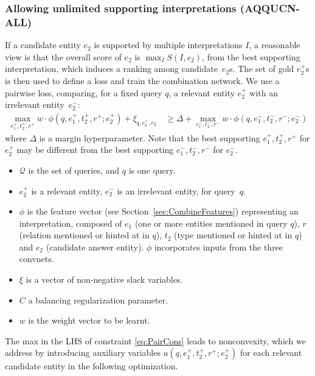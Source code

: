 \documentclass{svjour3}
\begin{document}
\subsubsection{Allowing unlimited supporting interpretations (AQQUCN-ALL)}
\label{sec:lvdt}

If a candidate entity $e_2$ is supported by multiple interpretations $I$, a reasonable view is that the overall score of $e_2$ is $\max_I S(I,e_2)$, from the best supporting interpretation, which induces a ranking among candidate~$e_2$s.  The set of gold $e_2^+$s is then used to define a loss and train the combination network.  We use a pairwise loss, comparing, for a fixed query $q$, a relevant entity $e_2^+$ with an irrelevant entity~$e_2^-$:
\begin{align}
\max_{e_1^+, t_2^+, r^+} \! w \cdot \phi(q, e_1^+, t_2^+, r^+; e_2^+) + 
\xi_{q, e_2^+, e_2^-} &\ge \Delta + \max_{e_1^-, t_2^-, r^-} \!
w \cdot \phi(q, e_1^-, t_2^-, r^-; e_2^-)  \label{eq:PairCons}
\end{align}
where $\Delta$ is a margin hyperparameter.  Note that the best supporting $e_1^+, t_2^+, r^+$ for $e_2^+$ may be different from the best supporting $e_1^-, t_2^-, r^-$ for $e_2^-$.
\begin{itemize}
\item $\mathcal{Q}$ is the set of queries, and $q$ is one query.
\item $e_2^+$ is a relevant entity, $e_2^-$ is an irrelevant entity, for query~$q$.
\item $\phi$ is the feature vector (see Section~\ref{sec:CombineFeatures}) representing an interpretation, composed of $e_1$ (one or more entities mentioned in query $q$), $r$ (relation mentioned or hinted at in $q$), $t_2$ (type mentioned or hinted at in $q$) and $e_2$ (candidate answer entity).  $\phi$ incorporates inputs from the three convnets.
\item $\xi$ is a vector of non-negative slack variables.
\item $C$ a balancing regularization parameter.
\item $w$ is the weight vector to be learnt.
\end{itemize}
The max in the LHS of constraint \eqref{eq:PairCons} leads to nonconvexity, which we address by introducing auxiliary variables $u(q, e_1^+, t_2^+, r^+; e_2^+)$ for each relevant candidate entity in the following optimization.
\end{document}
